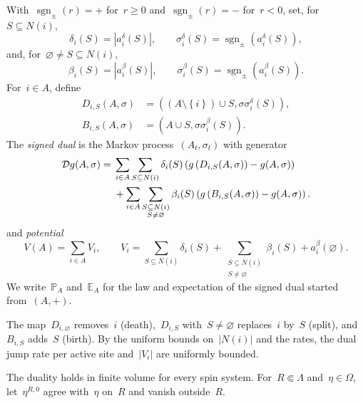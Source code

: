 \documentclass[EJP,preprint,NODS,nobera]{ejpecp}
\newcommand{\pP}{\mathbb{P}}
\newcommand{\E}{\mathbb{E}}
\newcommand{\bb}[1]{\left(#1\right)}
\newcommand{\cb}[1]{\left\{#1\right\}}
\newcommand{\abs}[1]{\left|#1\right|}
\newcommand{\Dcal}{\mathcal{D}}
\newcommand{\chg}[1]{{\color{changegreen}#1}}
\begin{document}
\chg{\begin{definition}
\label{def:signed-dual}
With~$\operatorname{sgn}_{\pm}(r)=+$ for~$r\geq0$
and~$\operatorname{sgn}_{\pm}(r)=-$ for~$r<0$, set, for~$S\subseteq N(i)$,
\begin{equation}
\label{eq:death-split-data}
\delta_i(S)
=
\abs{a_i^\delta(S)},
\qquad
\sigma_i^\delta(S)
=
\operatorname{sgn}_{\pm}\bb{a_i^\delta(S)},
\end{equation}
and, for~$\varnothing\neq S\subseteq N(i)$,
\begin{equation}
\label{eq:birth-data}
\beta_i(S)
=
\abs{a_i^\beta(S)},
\qquad
\sigma_i^\beta(S)
=
\operatorname{sgn}_{\pm}\bb{a_i^\beta(S)}.
\end{equation}
For~$i\in A$, define
\begin{align*}
D_{i,S}(A,\sigma)
&=
\bb{
\bb{A\setminus\cb{i}}\cup S,
\sigma\sigma_i^\delta(S)
},
\\
B_{i,S}(A,\sigma)
&=
\bb{
A\cup S,
\sigma\sigma_i^\beta(S)
}.
\end{align*}
The \emph{signed dual} is the Markov process~$(A_t,\sigma_t)$ with generator
\begin{align}
\label{eq:signed-dual-generator}
\Dcal g(A,\sigma)
={}&
\sum_{i\in A}\sum_{S\subseteq N(i)}
\delta_i(S)
\bb{
g\bb{D_{i,S}(A,\sigma)}-g(A,\sigma)
}
\notag\\
&+
\sum_{i\in A}
\sum_{\substack{S\subseteq N(i)\\S\neq\varnothing}}
\beta_i(S)
\bb{
g\bb{B_{i,S}(A,\sigma)}-g(A,\sigma)
}.
\end{align}
and \emph{potential}
\begin{equation}
\label{eq:dual-potential}
V(A)
=
\sum_{i\in A}V_i,
\qquad
V_i
=
\sum_{S\subseteq N(i)}\delta_i(S)
+
\sum_{\substack{S\subseteq N(i)\\S\neq\varnothing}}\beta_i(S)
+
a_i^\beta(\varnothing).
\end{equation}
We write~$\pP_A$ and~$\E_A$ for the law and expectation of the signed dual
started from~$(A,+)$.
\end{definition}}

\chg{\begin{remark}
The map~$D_{i,\varnothing}$ removes~$i$ (death),~$D_{i,S}$
with~$S\neq\varnothing$ replaces~$i$ by~$S$ (split), and~$B_{i,S}$ adds~$S$
(birth). By the uniform bounds on~$\abs{N(i)}$ and the rates, the dual jump
rate per active site and~$\abs{V_i}$ are uniformly bounded.
\end{remark}}

\chg{The duality holds in finite volume for every spin system. For~$R\Subset\Lambda$
and~$\eta\in\Omega$, let~$\eta^{R,0}$ agree with~$\eta$ on~$R$ and vanish
outside~$R$.}
\end{document}
